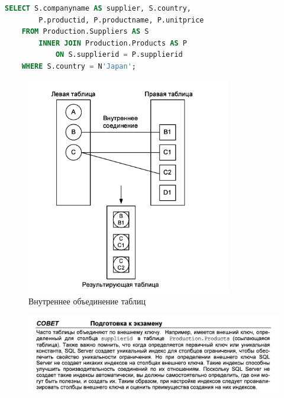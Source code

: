 \begin{lstlisting}[label=lst:funcReturn, caption=Пример INNER JOIN, language=sql]
	SELECT S.companyname AS supplier, S.country,
		P.productid, P.productname, P.unitprice
   	FROM Production.Suppliers AS S
		INNER JOIN Production.Products AS P
			ON S.supplierid = P.supplierid
   	WHERE S.country = N'Japan'; 
\end{lstlisting}

\begin{figure}[h!]
	\begin{center}
		\includegraphics[width=0.8\textwidth]{img/inner.png}
	\end{center}
	\caption{Внутреннее объединение таблиц}
	\captionsetup{justification=centering}
\end{figure}


\begin{figure}[h!]
	\begin{center}
		\includegraphics[width=1\textwidth]{img/advice7.png}
	\end{center}
	\captionsetup{justification=centering}
\end{figure}



